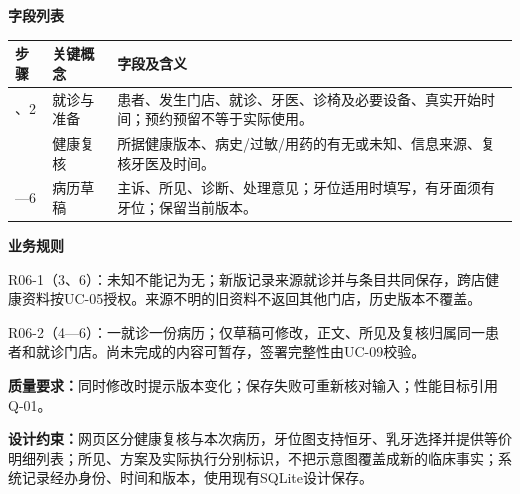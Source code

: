 \documentclass[UTF8,a4paper,zihao=-4,fontset=none]{ctexart}
\begin{document}
\noindent\textbf{字段列表}\par
{\setlength{\tabcolsep}{3pt}\renewcommand{\arraystretch}{1.04}
\noindent\begin{tabular}{@{}>{\raggedright\arraybackslash}p{1.2cm}>{\raggedright\arraybackslash}p{2.2cm}>{\raggedright\arraybackslash}p{12.3cm}@{}}
\toprule
步骤 & 关键概念 & 字段及含义 \\ \midrule
1、2 & 就诊与准备 & 患者、发生门店、就诊、牙医、诊椅及必要设备、真实开始时间；预约预留不等于实际使用。 \\
3 & 健康复核 & 所据健康版本、病史/过敏/用药的有无或未知、信息来源、复核牙医及时间。 \\
4—6 & 病历草稿 & 主诉、所见、诊断、处理意见；牙位适用时填写，有牙面须有牙位；保留当前版本。 \\
\bottomrule
\end{tabular}\par}
\smallskip
\noindent\textbf{业务规则}\par
\noindent R06-1（3、6）：未知不能记为无；新版记录来源就诊并与条目共同保存，跨店健康资料按UC-05授权。来源不明的旧资料不返回其他门店，历史版本不覆盖。\par
\noindent R06-2（4—6）：一就诊一份病历；仅草稿可修改，正文、所见及复核归属同一患者和就诊门店。尚未完成的内容可暂存，签署完整性由UC-09校验。\par
\smallskip
\noindent\textbf{质量要求：}同时修改时提示版本变化；保存失败可重新核对输入；性能目标引用Q-01。\par
\noindent\textbf{设计约束：}网页区分健康复核与本次病历，牙位图支持恒牙、乳牙选择并提供等价明细列表；所见、方案及实际执行分别标识，不把示意图覆盖成新的临床事实；系统记录经办身份、时间和版本，使用现有SQLite设计保存。\par
\endgroup
\clearpage
\end{document}
